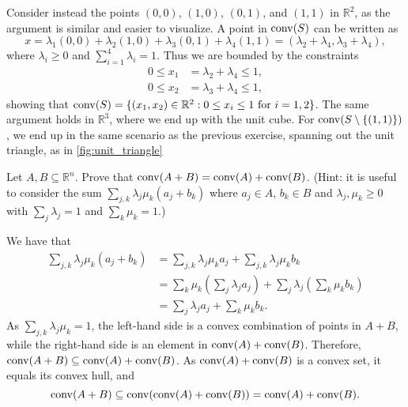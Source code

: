 \begin{solution}
  Consider instead the points $(0, 0)$, $(1, 0)$, $(0, 1)$, and $(1, 1)$ in $\mathbb{R}^2$, as the argument is similar and easier to visualize.
  A point in $\operatorname*{conv}(S)$ can be written as
  \begin{equation}
    x
    = \lambda_1 (0, 0) + \lambda_2 (1, 0) + \lambda_3 (0, 1) + \lambda_4 (1, 1)
    = (\lambda_2 + \lambda_4, \lambda_3 + \lambda_4),
  \end{equation}
  where $\lambda_i \geq 0$ and $\sum_{i=1}^4 \lambda_i = 1$.
  Thus we are bounded by the constraints
  \begin{align*}
    0 \leq x_1 &= \lambda_2 + \lambda_4 \leq 1, \\
    0 \leq x_2 &= \lambda_3 + \lambda_4 \leq 1,
  \end{align*}
  showing that $\operatorname*{conv}(S) = \{ (x_1, x_2) \in \mathbb{R}^2 : 0 \leq x_i \leq 1 \text{ for } i = 1, 2 \}$.
  The same argument holds in $\mathbb{R}^3$, where we end up with the unit cube.
  For $\operatorname*{conv}(S \setminus \{(1, 1)\})$, we end up in the same scenario as the previous exercise, spanning out the unit triangle, as in \cref{fig:unit_triangle}
\end{solution}

\begin{exercise}
  Let $A, B \subseteq \mathbb{R}^n$.
  Prove that $\operatorname*{conv}(A + B) = \operatorname*{conv}(A) + \operatorname*{conv}(B)$.
  (Hint: it is useful to consider the sum $\sum_{j,k} \lambda_j \mu_k (a_j + b_k)$ where $a_j \in A$, $b_k \in B$ and $\lambda_j, \mu_k \geq 0$ with $\sum_j \lambda_j = 1$ and $\sum_k \mu_k = 1$.)
\end{exercise}

\begin{solution}
  We have that
  \begin{align*}
    \sum_{j,k} \lambda_j \mu_k (a_j + b_k)
    &= \sum_{j,k} \lambda_j \mu_k a_j + \sum_{j,k} \lambda_j \mu_k b_k \\
    &= \sum_k \mu_k \left( \sum_j \lambda_j a_j \right) + \sum_j \lambda_j \left( \sum_k \mu_k b_k \right) \\
    &= \sum_j \lambda_j a_j + \sum_k \mu_k b_k.
  \end{align*}
  As $\sum_{j,k} \lambda_j \mu_k = 1$, the left-hand side is a convex combination of points in $A + B$, while the right-hand side is an element in $\operatorname*{conv}(A) + \operatorname*{conv}(B)$.
  Therefore, $\operatorname*{conv}(A + B) \subseteq \operatorname*{conv}(A) + \operatorname*{conv}(B)$.
  As $\operatorname*{conv}(A) + \operatorname*{conv}(B)$ is a convex set, it equals its convex hull, and
  \begin{equation}
    \operatorname*{conv}(A + B) \subseteq \operatorname*{conv}(\operatorname*{conv}(A) + \operatorname*{conv}(B)) = \operatorname*{conv}(A) + \operatorname*{conv}(B).
  \end{equation}
\end{solution}

